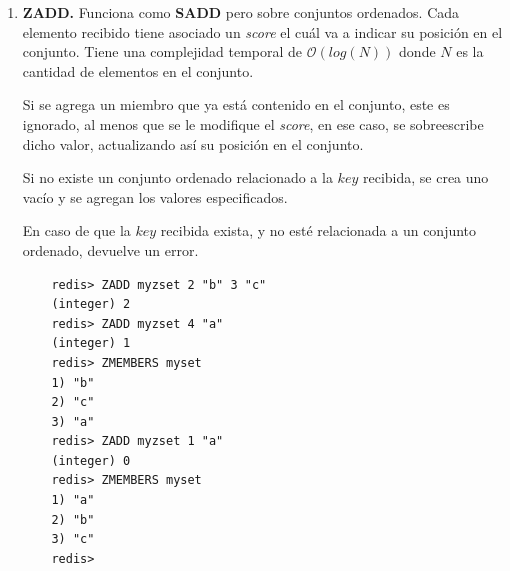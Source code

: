\documentclass[pdflatex,sn-mathphys-num]{sn-jnl}
\theoremstyle{thmstyleone}%
\theoremstyle{thmstyletwo}%
\theoremstyle{thmstylethree}%
\begin{document}
\begin{enumerate}
    




        
    \item \textbf{ZADD.} Funciona como \textbf{SADD} pero sobre conjuntos ordenados. Cada elemento recibido tiene asociado un \textit{score} el cuál va a indicar su posición en el conjunto. Tiene una complejidad temporal de $\mathcal{O}(log(N))$ donde $N$ es la cantidad de elementos en el conjunto. 

    Si se agrega un miembro que ya está contenido en el conjunto, este es ignorado, al menos que se le modifique el \textit{score}, en ese caso, se sobreescribe dicho valor, actualizando así su posición en el conjunto.
    
    Si no existe un conjunto ordenado relacionado a la $key$ recibida, se crea uno vacío y se agregan los valores especificados.

    En caso de que la $key$ recibida exista, y no esté relacionada a un conjunto ordenado, devuelve un error.
    
    \begin{verbatim}
    redis> ZADD myzset 2 "b" 3 "c"
    (integer) 2
    redis> ZADD myzset 4 "a"
    (integer) 1
    redis> ZMEMBERS myset
    1) "b"
    2) "c"
    3) "a"
    redis> ZADD myzset 1 "a"
    (integer) 0
    redis> ZMEMBERS myset
    1) "a"
    2) "b"
    3) "c"
    redis>
    \end{verbatim}


\end{enumerate}
\end{document}
